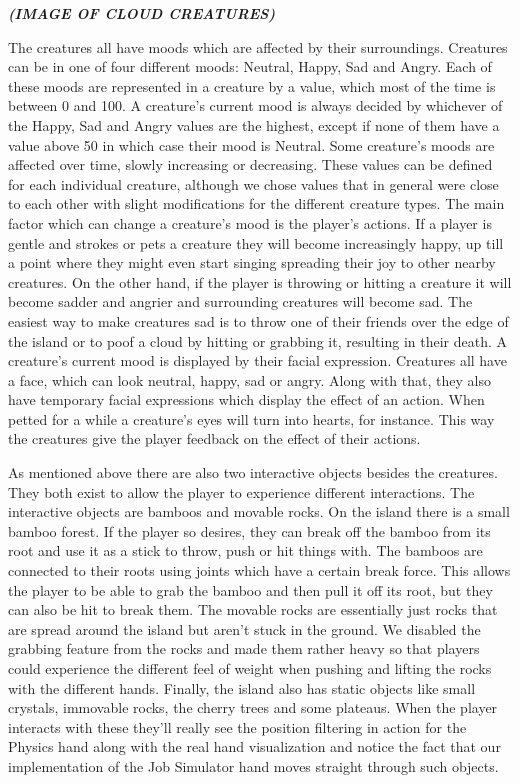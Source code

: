 \textbf{\textit{(IMAGE OF CLOUD CREATURES)}}

The creatures all have moods which are affected by their surroundings. Creatures can be in one of four different moods: Neutral, Happy, Sad and Angry. Each of these moods are represented in a creature by a value, which most of the time is between 0 and 100. A creature's current mood is always decided by whichever of the Happy, Sad and Angry values are the highest, except if none of them have a value above 50 in which case their mood is Neutral. Some creature's moods are affected over time, slowly increasing or decreasing. These values can be defined for each individual creature, although we chose values that in general were close to each other with slight modifications for the different creature types. The main factor which can change a creature's mood is the player's actions. If a player is gentle and strokes or pets a creature they will become increasingly happy, up till a point where they might even start singing spreading their joy to other nearby creatures. On the other hand, if the player is throwing or hitting a creature it will become sadder and angrier and surrounding creatures will become sad. The easiest way to make creatures sad is to throw one of their friends over the edge of the island or to poof a cloud by hitting or grabbing it, resulting in their death. A creature's current mood is displayed by their facial expression. Creatures all have a face, which can look neutral, happy, sad or angry. Along with that, they also have temporary facial expressions which display the effect of an action. When petted for a while a creature's eyes will turn into hearts, for instance. This way the creatures give the player feedback on the effect of their actions.

As mentioned above there are also two interactive objects besides the creatures. They both exist to allow the player to experience different interactions. The interactive objects are bamboos and movable rocks. On the island there is a small bamboo forest. If the player so desires, they can break off the bamboo from its root and use it as a stick to throw, push or hit things with. The bamboos are connected to their roots using joints which have a certain break force. This allows the player to be able to grab the bamboo and then pull it off its root, but they can also be hit to break them. The movable rocks are essentially just rocks that are spread around the island but aren't stuck in the ground. We disabled the grabbing feature from the rocks and made them rather heavy so that players could experience the different feel of weight when pushing and lifting the rocks with the different hands. Finally, the island also has static objects like small crystals, immovable rocks, the cherry trees and some plateaus. When the player interacts with these they'll really see the position filtering in action for the Physics hand along with the real hand visualization and notice the fact that our implementation of the Job Simulator hand moves straight through such objects. 


